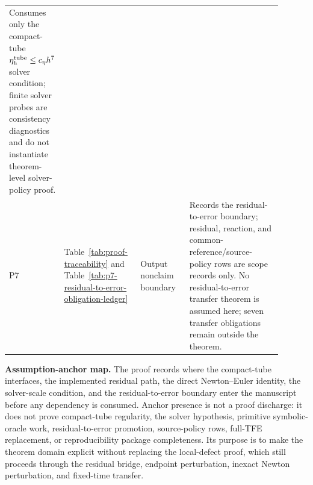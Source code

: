 \documentclass[preprint,12pt]{elsarticle}
\newcommand{\tfe}{TFE}
\begin{document}
\begin{table}[htbp]
\begin{tabular}{P{0.10\linewidth}P{0.28\linewidth}P{0.18\linewidth}P{0.34\linewidth}}
Consumes only the compact-tube \(\eta_h^{\rm tube}\le c_\eta h^7\)
solver condition; finite solver probes are consistency diagnostics and do
not instantiate theorem-level solver-policy proof. \\
P7 & Table~\ref{tab:proof-traceability} and
Table~\ref{tab:p7-residual-to-error-obligation-ledger} &
Output nonclaim boundary &
Records the residual-to-error boundary; residual, reaction, and
common-reference/source-policy rows are scope records only. No residual-to-error
transfer theorem is assumed here; seven transfer obligations remain outside
the theorem. \\
\bottomrule
\end{tabular}
\end{table}

\noindent\textbf{Assumption-anchor map.}
The proof records where the compact-tube interfaces,
the implemented residual path, the direct Newton--Euler identity, the
solver-scale condition, and the residual-to-error boundary enter the
manuscript before any dependency is consumed. Anchor presence is not a proof
discharge: it does not prove compact-tube regularity, the solver hypothesis,
primitive symbolic-oracle work, residual-to-error promotion, source-policy
rows, full-\tfe{} replacement, or reproducibility package completeness.  Its
purpose is to make the theorem domain explicit without replacing the
local-defect proof, which still proceeds through the residual bridge,
endpoint perturbation, inexact Newton perturbation, and fixed-time transfer.
\end{document}
